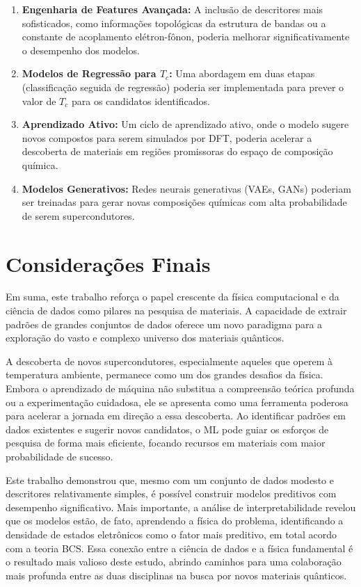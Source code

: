 \documentclass[12pt, a4paper, oneside]{report}
\begin{document}
\begin{enumerate}
    \item \textbf{Engenharia de Features Avançada:} A inclusão de descritores mais sofisticados, como informações topológicas da estrutura de bandas ou a constante de acoplamento elétron-fônon, poderia melhorar significativamente o desempenho dos modelos.
    \item \textbf{Modelos de Regressão para $T_c$:} Uma abordagem em duas etapas (classificação seguida de regressão) poderia ser implementada para prever o valor de $T_c$ para os candidatos identificados.
    \item \textbf{Aprendizado Ativo:} Um ciclo de aprendizado ativo, onde o modelo sugere novos compostos para serem simulados por DFT, poderia acelerar a descoberta de materiais em regiões promissoras do espaço de composição química.
    \item \textbf{Modelos Generativos:} Redes neurais generativas (VAEs, GANs) poderiam ser treinadas para gerar novas composições químicas com alta probabilidade de serem supercondutores.
\end{enumerate}

\section{Considerações Finais}

Em suma, este trabalho reforça o papel crescente da física computacional e da ciência de dados como pilares na pesquisa de materiais. A capacidade de extrair padrões de grandes conjuntos de dados oferece um novo paradigma para a exploração do vasto e complexo universo dos materiais quânticos.

A descoberta de novos supercondutores, especialmente aqueles que operem à temperatura ambiente, permanece como um dos grandes desafios da física. Embora o aprendizado de máquina não substitua a compreensão teórica profunda ou a experimentação cuidadosa, ele se apresenta como uma ferramenta poderosa para acelerar a jornada em direção a essa descoberta. Ao identificar padrões em dados existentes e sugerir novos candidatos, o ML pode guiar os esforços de pesquisa de forma mais eficiente, focando recursos em materiais com maior probabilidade de sucesso.

Este trabalho demonstrou que, mesmo com um conjunto de dados modesto e descritores relativamente simples, é possível construir modelos preditivos com desempenho significativo. Mais importante, a análise de interpretabilidade revelou que os modelos estão, de fato, aprendendo a física do problema, identificando a densidade de estados eletrônicos como o fator mais preditivo, em total acordo com a teoria BCS. Essa conexão entre a ciência de dados e a física fundamental é o resultado mais valioso deste estudo, abrindo caminhos para uma colaboração mais profunda entre as duas disciplinas na busca por novos materiais quânticos.
\end{document}
